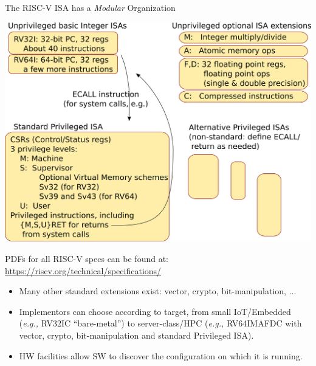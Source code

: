 \documentclass{article}
\newcommand{\eg}{\emph{e.g.,}}
\begin{document}
\clearpage


\begin{center}
{\Huge
  The RISC-V ISA has a \emph{Modular} Organization}

\vspace*{0.3in}

{\includegraphics[scale=0.7]{Figs/ISA_Modularity.png}}

PDFs for all RISC-V specs can be found at: \url{https://riscv.org/technical/specifications/}

\vspace{0.5in}

\begin{minipage}{11in}
  \begin{itemize}\LARGE

  \item Many other standard extensions exist: vector, crypto, bit-manipulation, ...

  \item Implementors can choose according to target, from small
    IoT/Embedded ({\eg} RV32IC ``bare-metal'') to server-class/HPC ({\eg}
    RV64IMAFDC with vector, crypto, bit-manipulation and standard
    Privileged ISA).

  \item HW facilities allow SW to discover the configuration on which it is running.

  \end{itemize}
\end{minipage}

\end{center}
\end{document}
